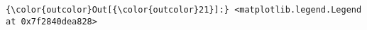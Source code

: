 \documentclass[11pt]{article}
\begin{document}
\begin{Verbatim}[commandchars=\\\{\}]
{\color{outcolor}Out[{\color{outcolor}21}]:} <matplotlib.legend.Legend at 0x7f2840dea828>
\end{Verbatim}
            
    \begin{center}
    \end{center}
    { \hspace*{\fill} \\}
    

    
    
    
    
\end{document}
